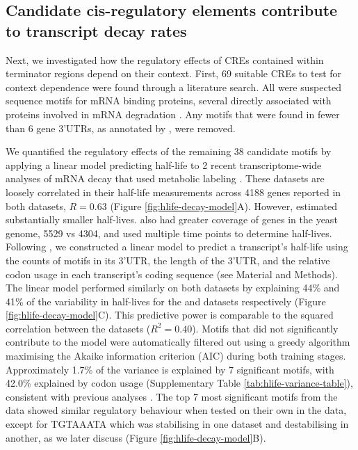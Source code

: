 \documentclass[../main.tex]{subfiles}
\begin{document}
\subsection{Candidate cis-regulatory elements contribute to transcript decay rates}

Next, we investigated how the regulatory effects of CREs contained within terminator regions depend on their context.
First, 69 suitable CREs to test for context dependence were found through a literature search.
All were suspected sequence motifs for mRNA binding proteins, several directly associated with proteins involved in mRNA degradation \parencite{Hogan2008,Shalgi2005,Cheng2017}.
Any motifs that were found in fewer than 6 gene 3'UTRs, as annotated by \parencite{Pelechano2013}, were removed.

We quantified the regulatory effects of the remaining 38 candidate motifs by applying a linear model predicting half-life to 2 recent transcriptome-wide analyses of mRNA decay that used metabolic labeling \parencite{Chan2018,Sun2013}.
These datasets are loosely correlated in their half-life measurements across 4188 genes reported in both datasets, \(R = 0.63\) (Figure \ref{fig:hlife-decay-model}A). However, \parencite{Chan2018} estimated substantially smaller half-lives.
\parencite{Chan2018} also had greater coverage of genes in the yeast genome, 5529 vs 4304, and used multiple time points to determine half-lives.
Following \parencite{Cheng2017}, we constructed a linear model to predict a transcript's half-life using the counts of motifs in its 3'UTR, the length of the 3'UTR, and the relative codon usage in each transcript's coding sequence (see Material and Methods).
The linear model performed similarly on both datasets by explaining 44\% and 41\% of the variability in half-lives for the \parencite{Chan2018} and \parencite{Sun2013} datasets respectively (Figure \ref{fig:hlife-decay-model}C).
This predictive power is comparable to the squared correlation between the datasets (\(R^2 = 0.40\)).
Motifs that did not significantly contribute to the model were automatically filtered out using a greedy algorithm maximising the Akaike information criterion (AIC) during both training stages.
Approximately 1.7\% of the variance is explained by 7 significant motifs, with 42.0\% explained by codon usage (Supplementary Table \ref{tab:hlife-variance-table}), consistent with previous analyses \parencite{Cheng2017, Presnyak2015}.
The top 7 most significant motifs from the \parencite{Chan2018} data showed similar regulatory behaviour when tested on their own in the \parencite{Sun2013} data, except for TGTAAATA which was stabilising in one dataset and destabilising in another, as we later discuss (Figure \ref{fig:hlife-decay-model}B).
\end{document}
